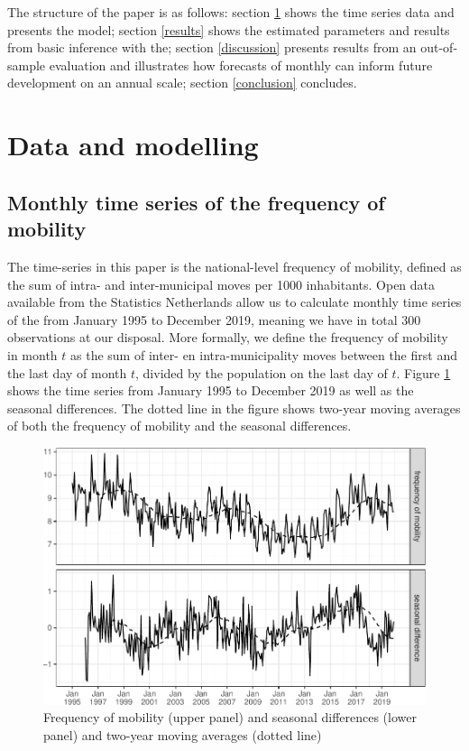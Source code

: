 \documentclass[12pt, a4paper]{article}
\begin{document}
The structure of the paper is as follows: section \ref{data} shows the time series data and presents the model; section \ref{results} shows the estimated parameters and results from basic inference with the; section \ref{discussion} presents results from an out-of-sample evaluation and illustrates how forecasts of monthly can inform future development on an annual scale; section \ref{conclusion} concludes.


\section{Data and modelling}\label{data}
\subsection{Monthly time series of the frequency of mobility}\label{monthly-time-series-of-the-frequency-of-mobility}

The time-series in this paper is the national-level frequency of
mobility, defined as the sum of intra- and inter-municipal moves per
1000 inhabitants. Open data available from the Statistics Netherlands
allow us to calculate monthly time series of the from January 1995 to
December 2019, meaning we have in total 300 observations at our
disposal. More formally, we define the frequency of mobility
in month $t$ as the sum of inter- en intra-municipality moves between the
first and the last day of month $t$, divided by the population on the
last day of $t$. Figure \ref{fig:freq-plot} shows the time series from January
1995 to December 2019 as well as the seasonal differences. The dotted line in the figure shows
two-year moving averages of both the frequency of mobility and the
seasonal differences.

\begin{figure}[H]
\caption{\label{fig:freq-plot}Frequency of mobility (upper panel) and
seasonal differences (lower panel) and two-year moving averages (dotted
line)}
\centering
\includegraphics[scale = 0.8]{../figs/freq--freq-plot-1.pdf}
\end{figure}
\end{document}
